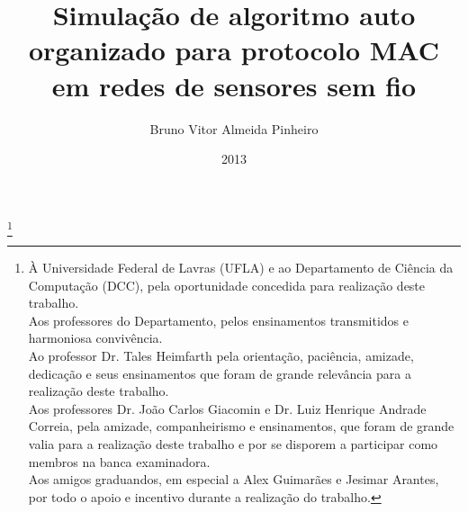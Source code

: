 \documentclass{uflamon}          %
\author{Bruno Vitor Almeida Pinheiro}
\title{Simulação de algoritmo auto organizado para protocolo MAC em redes de sensores sem fio}
\date{2013}
\begin{document}
\maketitle

\thanks{À Universidade Federal de Lavras (UFLA) e ao Departamento de Ciência da Computação (DCC), pela oportunidade concedida para realização deste trabalho. \\Aos professores do Departamento, pelos ensinamentos transmitidos e harmoniosa convivência.\\Ao professor Dr. Tales Heimfarth pela orientação, paciência, amizade, dedicação e seus ensinamentos que foram de grande relevância para a realização deste trabalho.\\Aos professores Dr. João Carlos Giacomin e Dr. Luiz Henrique Andrade Correia, pela amizade, companheirismo e ensinamentos, que foram de grande valia para a realização deste trabalho e por se disporem a participar como membros na banca examinadora.\\Aos amigos graduandos, em especial a Alex Guimarães e Jesimar Arantes, por todo o apoio e incentivo durante a realização do trabalho.}         %

\pagestyle{ufla}

\tableofcontents                           %
\listoffigures                             %
\end{document}

